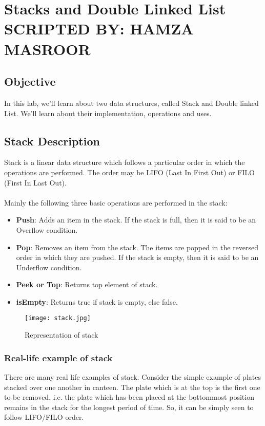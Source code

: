\documentclass[11pt,fleqn]{book} %
\begin{document}
\chapter{Stacks and Double Linked List\hspace{4mm} {\textsc{\small SCRIPTED BY: HAMZA MASROOR}}}
\section{Objective}
In this lab, we'll learn about two data structures, called Stack and Double linked List. We'll learn about their implementation, operations and uses.
\section{Stack Description}
Stack is a linear data structure which follows a particular order in which the operations are performed. The order may be LIFO (Last In First Out) or FILO (First In Last Out).\\ ~\\
Mainly the following three basic operations are performed in the stack:
\begin{itemize}
\item \textbf{Push}: Adds an item in the stack. If the stack is full, then it is said to be an Overflow condition.
\item \textbf{Pop}: Removes an item from the stack. The items are popped in the reversed order in which they are pushed. If the stack is empty, then it is said to be an Underflow condition.
\item \textbf{Peek or Top}: Returns top element of stack.
\item \textbf{isEmpty}: Returns true if stack is empty, else false.
\end{itemize}
\begin{figure}[H]
	\centering
	\texttt{[image: stack.jpg]}
	\caption{Representation of stack}
\end{figure}
\newpage
\subsection{Real-life example of stack}
There are many real life examples of stack. Consider the simple example of plates stacked over one another in canteen. The plate which is at the top is the first one to be removed, i.e. the plate which has been placed at the bottommost position remains in the stack for the longest period of time. So, it can be simply seen to follow LIFO/FILO order.
\end{document}
